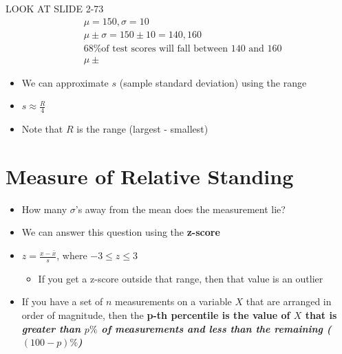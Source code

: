 \begin{problem}
	LOOK AT SLIDE 2-73\\

	\begin{equation*}
		\begin{aligned}
			&\mu = 150, \sigma = 10\\	
			&\mu \pm \sigma = 150 \pm 10 = 140,160\\
			&\text{68\% of test scores will fall between 140 and 160}\\
			&\mu \pm %
		\end{aligned}
	\end{equation*}
\end{problem}

\begin{itemize}
	\item We can approximate $s$ (sample standard deviation) using the range
	\item $s \approx \frac{R}{4}$
	\item Note that $R$ is the range (largest - smallest)
\end{itemize}

\section{Measure of Relative Standing}

\begin{itemize}
	\item How many $\sigma$'s away from the mean does the measurement lie?
	\item We can answer this question using the \bf{z-score}
	\item $z = \frac{x - \bar{x}}{s}$, where $-3 \le z \le 3$
	\begin{itemize}
		\item If you get a z-score outside that range, then that value is an outlier
	\end{itemize}
	\item If you have a set of $n$ measurements on a variable $X$ that are arranged in order of magnitude, then the \bf{p-th percentile} is the value of $X$ that is \it{greater than $p\%$ of measurements and less than the remaining ($(100-p)\%$)}
\end{itemize}